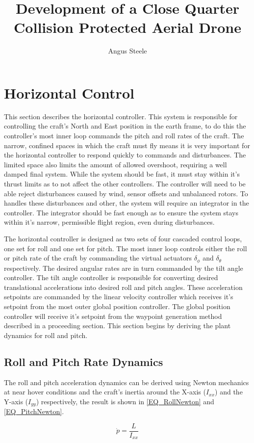 \documentclass[12pt]{report}
\title{Development of a Close Quarter Collision Protected Aerial Drone}
\author{Angus Steele}
\begin{document}
\section{Horizontal Control}
This section describes the horizontal controller. This system is responsible for controlling the craft's North and East position in the earth frame, to do this the controller's most inner loop commands the pitch and roll rates of the craft. The narrow, confined spaces in which the craft must fly means it is very important for the horizontal controller to respond quickly to commands and disturbances. The limited space also limits the amount of allowed overshoot, requiring a well damped final system. While the system should be fast, it must stay within it's thrust limits as to not affect the other controllers. The controller will need to be able reject disturbances caused by wind, sensor offsets and unbalanced rotors. To handles these disturbances and other, the system will require an integrator in the controller. The integrator should be fast enough as to ensure the system stays within it's narrow, permissible flight region, even during disturbances.

The horizontal controller is designed as two sets of four cascaded control loops, one set for roll and one set for pitch. The most inner loop controls either the roll or pitch rate of the craft by commanding the virtual actuators $\delta_\phi$ and $\delta_\theta$ respectively. The desired angular rates are in turn commanded by the tilt angle controller. The tilt angle controller is responsible for converting desired translational accelerations into desired roll and pitch angles. These acceleration setpoints are commanded by the linear velocity controller which receives it's setpoint from the most outer global position controller. The global position controller will receive it's setpoint from the waypoint generation method described in a proceeding section. This section begins by deriving the plant dynamics for roll and pitch.

\subsection{Roll and Pitch Rate Dynamics}
The roll and pitch acceleration dynamics can be derived using Newton mechanics at near hover conditions and the craft's inertia around the X-axis ($I_{xx}$) and the Y-axis ($I_{yy}$) respectively, the result is shown in \eqref{EQ_RollNewton} and \eqref{EQ_PitchNewton}.

\begin{equation}
\label{EQ_RollNewton}
\dot{p} = \dfrac{L}{I_{xx}}
\end{equation}
\end{document}
